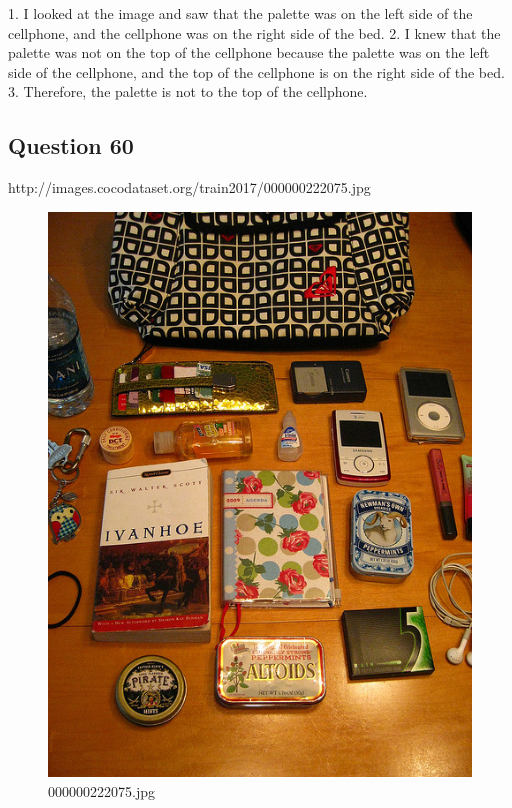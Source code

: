 \begin{enumerate}
    1. I looked at the image and saw that the palette was on the left side of the cellphone, and the cellphone was on the right side of the bed.
    2. I knew that the palette was not on the top of the cellphone because the palette was on the left side of the cellphone, and the top of the cellphone is on the right side of the bed.
    3. Therefore, the palette is not to the top of the cellphone.
\end{enumerate}
\subsection*{Question 60}
http://images.cocodataset.org/train2017/000000222075.jpg
\begin{figure}[h]
    \centering
    \includegraphics[width=0.8\linewidth]{../image set/hard/000000222075.jpg}
    \caption{000000222075.jpg}
\end{figure}
